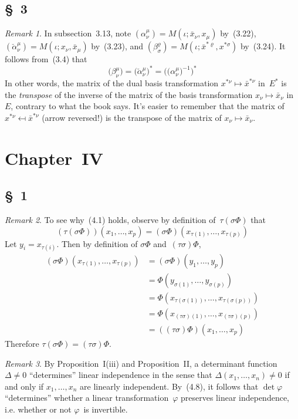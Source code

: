 \documentclass[letterpaper,12pt]{article}
\theoremstyle{definition}
\theoremstyle{remark}
\newtheorem*{rmk}{Remark}
\begin{document}
\subsection*{\S~3}
\begin{rmk}
In subsection~3.13, note \((\alpha^{\mu}_{\nu})=M(\iota;\bar{x}_{\nu},x_{\mu})\) by~(3.22), \((\check{\alpha}^{\mu}_{\nu})=M(\iota;x_{\nu},\bar{x}_{\mu})\) by~(3.23), and \((\beta^{\varrho}_{\sigma})=M(\iota;\bar{x}^{*\varrho},x^{*\sigma})\) by~(3.24). It follows from~(3.4) that
\[\bigl(\beta^{\mu}_{\nu}\bigr)=\bigl(\check{\alpha}^{\mu}_{\nu}\bigr)^*=\bigl(\bigl(\alpha^{\mu}_{\nu}\bigr)^{-1}\bigr)^*\]
In other words, the matrix of the dual basis transformation \(x^{*\nu}\mapsto\bar{x}^{*\nu}\) in~\(E^*\) is the \emph{transpose} of the inverse of the matrix of the basis transformation \(x_{\nu}\mapsto\bar{x}_{\nu}\) in~\(E\), contrary to what the book says. It's easier to remember that the matrix of \(x^{*\nu}\mapsfrom\bar{x}^{*\nu}\) (arrow reversed!) is the transpose of the matrix of \(x_{\nu}\mapsto\bar{x}_{\nu}\).
\end{rmk}

\section*{Chapter~IV}
\subsection*{\S~1}
\begin{rmk} To see why~(4.1) holds, observe by definition of~\(\tau(\sigma\Phi)\) that
\[(\tau(\sigma\Phi))(x_1,\ldots,x_p)=(\sigma\Phi)(x_{\tau(1)},\ldots,x_{\tau(p)})\]
Let \(y_i=x_{\tau(i)}\). Then by definition of \(\sigma\Phi\) and~\((\tau\sigma)\Phi\),
\begin{align*}
(\sigma\Phi)(x_{\tau(1)},\ldots,x_{\tau(p)})&=(\sigma\Phi)(y_1,\ldots,y_p)\\
	&=\Phi(y_{\sigma(1)},\ldots,y_{\sigma(p)})\\
	&=\Phi(x_{\tau(\sigma(1))},\ldots,x_{\tau(\sigma(p))})\\
	&=\Phi(x_{(\tau\sigma)(1)},\ldots,x_{(\tau\sigma)(p)})\\
	&=((\tau\sigma)\Phi)(x_1,\ldots,x_p)
\end{align*}
Therefore \(\tau(\sigma\Phi)=(\tau\sigma)\Phi\).
\end{rmk}

\begin{rmk}
By Proposition~I(iii) and Proposition~II, a determinant function \(\Delta\ne 0\) ``determines'' linear independence in the sense that \(\Delta(x_1,\ldots,x_n)\ne0\) if and only if \(x_1,\ldots,x_n\) are linearly independent. By~(4.8), it follows that \(\det\varphi\) ``determines'' whether a linear transformation~\(\varphi\) preserves linear independence, i.e. whether or not \(\varphi\)~is invertible.
\end{rmk}
\end{document}
